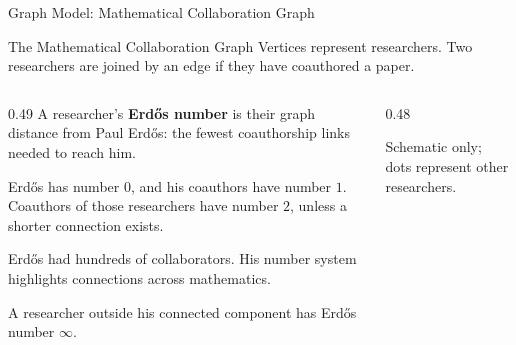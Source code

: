 \documentclass[aspectratio=169,11pt]{beamer}
\begin{document}
\begin{frame}[t]{Graph Model: Mathematical Collaboration Graph}
\begin{block}{The Mathematical Collaboration Graph}
Vertices represent researchers. Two researchers are joined by an edge if they have coauthored a paper.
\end{block}

\vspace{0.18cm}
\begin{columns}[c,onlytextwidth]
\begin{column}{0.49\textwidth}
\small
A researcher's \textbf{Erd\H{o}s number} is their graph distance from Paul Erd\H{o}s: the fewest coauthorship links needed to reach him.

\medskip
Erd\H{o}s has number $0$, and his coauthors have number $1$. Coauthors of those researchers have number $2$, unless a shorter connection exists.

\medskip
Erd\H{o}s had hundreds of collaborators. His number system highlights connections across mathematics.

\medskip
A researcher outside his connected component has Erd\H{o}s number $\infty$.
\end{column}
\begin{column}{0.48\textwidth}
\centering
{}
\par\smallskip
{\scriptsize Schematic only; dots represent other researchers.}
\end{column}
\end{columns}
\end{frame}
\end{document}
